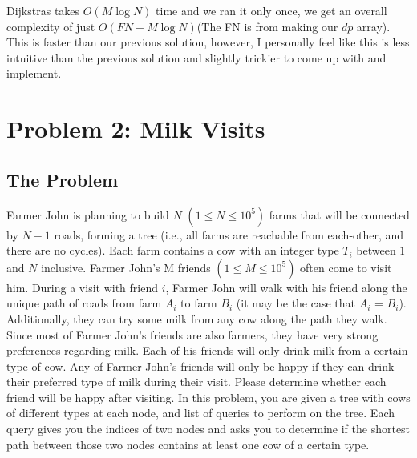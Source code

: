 \documentclass{article}
\begin{document}
    \hspace*{1em} \quad Dijkstras takes $O(M \log N)$ time and we ran it only once, we get an overall complexity of just $O(FN + M \log N)$(The FN is from making our $dp$ array). This is faster than our previous solution, however, I personally feel like this is less intuitive than the previous solution and slightly trickier to come up with and implement.





\section{Problem 2: Milk Visits}
\subsection{The Problem}
Farmer John is planning to build $N$ $(1\leq N \leq 10^5)$ farms that will be connected by $N - 1$ roads, forming a tree (i.e., all farms are reachable from each-other, and there are no cycles). Each farm contains a cow with an integer type $T_i$ between $1$ and $N$ inclusive.
\newline
\newline
Farmer John's M friends $(1\leq M \leq 10^5)$ often come to visit him. During a visit with friend $i$, Farmer John will walk with his friend along the unique path of roads from farm $A_i$ to farm $B_i$ (it may be the case that $A_i$ = $B_i$). Additionally, they can try some milk from any cow along the path they walk. Since most of Farmer John's friends are also farmers, they have very strong preferences regarding milk. Each of his friends will only drink milk from a certain type of cow. Any of Farmer John's friends will only be happy if they can drink their preferred type of milk during their visit.
\newline
\newline
Please determine whether each friend will be happy after visiting.
\newline
\newline
In this problem, you are given a tree with cows of different types at each node, and list of queries to perform on the tree. Each query gives you the indices of two nodes and asks you to determine if the shortest path between those two nodes contains at least one cow of a certain type.
\end{document}
